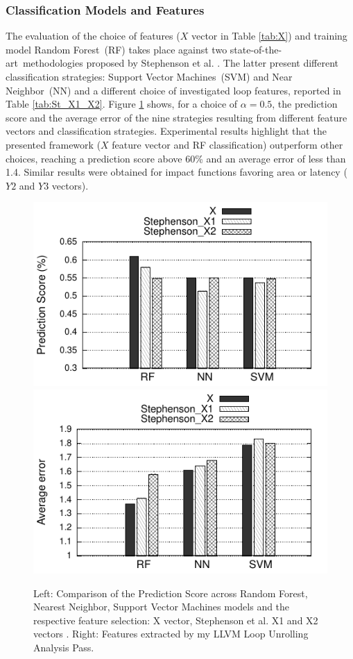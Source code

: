 \documentclass[]{usiinfthesis}
\newcommand{\SoTA}{{state-of-the-art}}
\newcommand{\RF}{{Random Forest}}
\newcommand{\SVM}{{Support Vector Machines}}
\newcommand{\NN}{{Near Neighbor}}
\begin{document}
\subsubsection{Classification Models and Features}
\label{subsec:mode_feature}

The evaluation of the choice of features ($X$ vector in Table \ref{tab:X}) and training model \RF\ 
(RF) takes place against two \SoTA\ methodologies proposed by Stephenson et al. 
\cite{StephensonApr05}. The latter present different classification strategies: 
\SVM\ (SVM) and \NN\ (NN) and a different choice of investigated loop features, reported in 
Table \ref{tab:St_X1_X2}. Figure \ref{fig:mod_score} shows, for a choice of $\alpha = 0.5$, the 
prediction score and the average error of the nine strategies resulting from different feature 
vectors and classification strategies. Experimental results highlight that the presented framework 
($X$ feature vector and RF classification)
outperform other choices, reaching a prediction score above  60\% and an average error of
less than 1.4. Similar results were obtained for impact functions favoring area or latency
($Y2$ and $Y3$ vectors).



\begin{figure}

\centering
  \hspace*{-2cm}
\includegraphics[width= .5 \linewidth]{figs/models_score}
\includegraphics[width= .5 \linewidth]{figs/models_error}
\hspace*{-2cm}
\vspace*{-0.2cm}
\caption{Left: Comparison of the Prediction Score across Random Forest, Nearest Neighbor, Support Vector Machines models 
and the respective feature selection: X vector, Stephenson et al. X1 and X2 vectors \cite{StephensonApr05}.
Right: Features extracted by my LLVM Loop Unrolling Analysis Pass.}
\label{fig:mod_score}
\end{figure}
\end{document}
